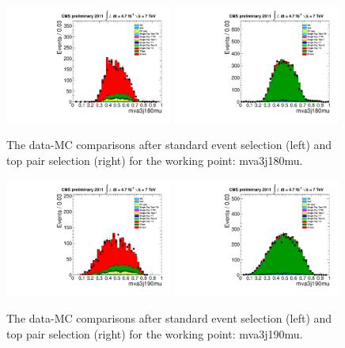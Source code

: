 \begin{figure}[!t]
  \centering
  \includegraphics[width=0.49\textwidth]{figs/cl-mva3j180mu-normal.pdf}
  \includegraphics[width=0.49\textwidth]{figs/cl-mva3j180mu-inTTbar.pdf}
  \caption{\label{fig:mva:plots-mva3j180mu} The data-MC comparisons
    after standard event selection (left) and top pair
    selection (right) for the working point: mva3j180mu.}
\end{figure}

\begin{figure}[!t]
  \centering
  \includegraphics[width=0.49\textwidth]{figs/cl-mva3j190mu-normal.pdf}
  \includegraphics[width=0.49\textwidth]{figs/cl-mva3j190mu-inTTbar.pdf}
  \caption{\label{fig:mva:plots-mva3j190mu} The data-MC comparisons
    after standard event selection (left) and top pair
    selection (right) for the working point: mva3j190mu.}
\end{figure}

